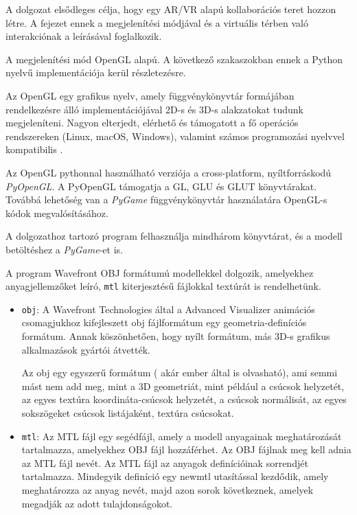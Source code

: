 


A dolgozat elsődleges célja, hogy egy AR/VR alapú kollaborációs teret hozzon létre.
A fejezet ennek a megjelenítési módjával és a virtuális térben való interakciónak a leírásával foglalkozik.


A megjelenítési mód OpenGL alapú.
A következő szakaszokban ennek a Python nyelvű implementációja kerül részletezésre.


Az OpenGL egy grafikus nyelv, amely függvénykönyvtár formájában rendelkezésre álló implementációjával 2D-s és 3D-s alakzatokat tudunk megjeleníteni. Nagyon elterjedt, elérhető és támogatott a fő operációs rendszereken (Linux, macOS, Windows), valamint számos programozási nyelvvel kompatibilis \cite{madsen2016opengl}.

Az OpenGL pythonnal használható verziója a cross-platform, nyíltforráskodú \textit{PyOpenGL}. A PyOpenGL támogatja a GL, GLU és GLUT könyvtárakat.
Továbbá lehetőség van a \textit{PyGame} függvénykönyvtár használatára OpenGL-s kódok megvalósításához.

A dolgozathoz tartozó program felhasználja mindhárom könyvtárat, és a modell betöltéshez a \textit{PyGame}-et is.


A program Wavefront OBJ formátumú modellekkel dolgozik, amelyekhez anyagjellemzőket leíró, \texttt{mtl} kiterjesztésű fájlokkal textúrát is rendelhetünk. 
\begin{itemize}
\item \texttt{obj}: A Wavefront Technologies által a Advanced Visualizer animációs csomagjukhoz kifejleszett obj fájlformátum egy geometria-definíciós formátum. 
Annak köszönhetően, hogy nyílt formátum, más 3D-s grafikus alkalmazások gyártói átvették.

Az obj egy egyszerű formátum ( akár ember által is olvasható), ami semmi mást nem add meg, mint a 3D geometriát, mint például a csúcsok helyzetét, az egyes textúra koordináta-csúcsok helyzetét, a csúcsok normálisát, az egyes sokszögeket csúcsok listájaként, textúra csúcsokat.

\item \texttt{mtl}: Az MTL fájl egy segédfájl, amely a modell anyagainak meghatározását tartalmazza, amelyekhez OBJ fájl hozzáférhet. Az OBJ fájlnak meg kell adnia az MTL fájl nevét. Az MTL fájl az anyagok definícióinak sorrendjét tartalmazza. Mindegyik definíció egy newmtl utasítással kezdődik, amely meghatározza az anyag nevét, majd azon sorok következnek, amelyek megadják az adott tulajdonságokot.
\end{itemize} 

